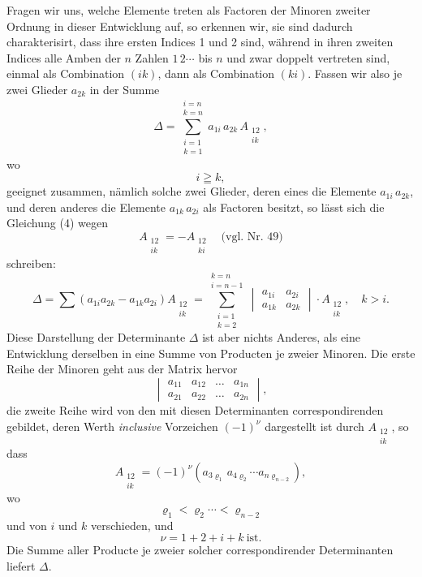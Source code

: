 \documentclass[11pt]{article}
\providecommand{\weberpage}[1]{}
\providecommand{\weq}[2]{\begin{equation}\tag{#1}#2\end{equation}}
\let\Delta\varDelta
\begin{document}
\weberpage{60}
Fragen wir uns, welche Elemente treten als Factoren der Minoren zweiter Ordnung in dieser Entwicklung auf, so erkennen wir, sie sind dadurch charakterisirt, dass ihre ersten Indices 1 und 2 sind, während in ihren zweiten Indices alle Amben der $n$ Zahlen $1\,2\cdots$ bis $n$ und zwar doppelt vertreten sind, einmal als Combination $(ik)$, dann als Combination $(ki)$. Fassen wir also je zwei Glieder $a_{2k}$ in der Summe
\weq{4}{
\Delta = \sum_{\substack{i=1\\k=1}}^{\substack{i=n\\k=n}} a_{1i}\, a_{2k}\, A_{\substack{12\\ik}},
}
wo
\[
i \geqq k,
\]
geeignet zusammen, nämlich solche zwei Glieder, deren eines die Elemente $a_{1i}\, a_{2k}$, und deren anderes die Elemente $a_{1k}\, a_{2i}$ als Factoren besitzt, so lässt sich die Gleichung (4) wegen
\[
A_{\substack{12\\ik}} = - A_{\substack{12\\ki}} \quad \text{(vgl. Nr. 49)}
\]
schreiben:
\weq{5}{
\Delta = \sum (a_{1i} a_{2k} - a_{1k} a_{2i}) A_{\substack{12\\ik}} = \sum_{\substack{i=1\\k=2}}^{\substack{k=n\\i=n-1}} \begin{vmatrix} a_{1i} & a_{2i} \\ a_{1k} & a_{2k} \end{vmatrix} \cdot A_{\substack{12\\ik}}, \quad k > i.
}
Diese Darstellung der Determinante $\Delta$ ist aber nichts Anderes, als eine Entwicklung derselben in eine Summe von Producten je zweier Minoren. Die erste Reihe der Minoren geht aus der Matrix hervor
\weq{A}{
\begin{vmatrix} a_{11} & a_{12} & \ldots & a_{1n} \\ a_{21} & a_{22} & \ldots & a_{2n} \end{vmatrix},
}
die zweite Reihe wird von den mit diesen Determinanten correspondirenden gebildet, deren Werth \textit{inclusive} Vorzeichen $(-1)^{\nu}$ dargestellt ist durch $A_{\substack{12\\ik}}$, so dass
\[
A_{\substack{12\\ik}} = (-1)^{\nu} (a_{3\varrho_1}\, a_{4\varrho_2} \cdots a_{n\varrho_{n-2}}),
\]
wo
\[
\varrho_1 < \varrho_2 \cdots < \varrho_{n-2}
\]
und von $i$ und $k$ verschieden,
und
\[
\nu = 1 + 2 + i + k \ \text{ist}.
\]
Die Summe aller Producte je zweier solcher correspondirender Determinanten liefert $\Delta$.
\end{document}
